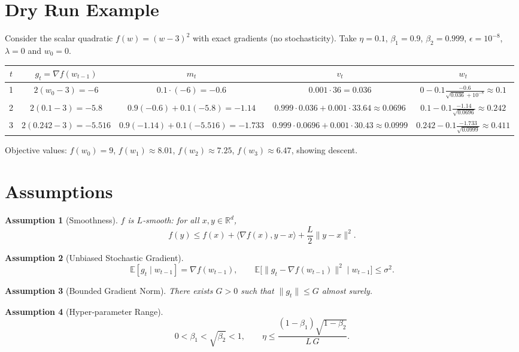 \documentclass[11pt]{article}
\newtheorem{assumption}{Assumption}
\newcommand{\E}{\mathbb{E}}
\newcommand{\R}{\mathbb{R}}
\begin{document}
\section*{Dry Run Example}
Consider the scalar quadratic $f(w)=(w-3)^2$ with exact gradients (no stochasticity).  
Take $\eta=0.1$, $\beta_1=0.9$, $\beta_2=0.999$, $\epsilon=10^{-8}$, $\lambda=0$ and $w_0=0$.  

\begin{tabular}{c|c|c|c|c}
$t$ & $g_t=\nabla f(w_{t-1})$ & $m_t$ & $v_t$ & $w_t$ \\ \hline
1 & $2(w_0-3)=-6$ & $0.1\cdot(-6)=-0.6$ & $0.001\cdot36=0.036$ & $0-0.1\frac{-0.6}{\sqrt{0.036}+10^{-8}}\approx0.1$\\
2 & $2(0.1-3)=-5.8$ & $0.9(-0.6)+0.1(-5.8)=-1.14$ & $0.999\cdot0.036+0.001\cdot33.64\approx0.0696$ & $0.1-0.1\frac{-1.14}{\sqrt{0.0696}}\approx0.242$\\
3 & $2(0.242-3)=-5.516$ & $0.9(-1.14)+0.1(-5.516)=-1.733$ & $0.999\cdot0.0696+0.001\cdot30.43\approx0.0999$ & $0.242-0.1\frac{-1.733}{\sqrt{0.0999}}\approx0.411$\\
\end{tabular}

Objective values: $f(w_0)=9$, $f(w_1)\approx8.01$, $f(w_2)\approx7.25$, $f(w_3)\approx6.47$, showing descent.

\newpage
\section*{Assumptions}
\begin{assumption}[Smoothness]
$f$ is $L$‑smooth: for all $x,y\in\R^{d}$,
\[
f(y)\le f(x)+\langle\nabla f(x),y-x\rangle+\frac{L}{2}\|y-x\|^{2}.
\]
\end{assumption}
\begin{assumption}[Unbiased Stochastic Gradient]
\[
\E[g_t\mid w_{t-1}]=\nabla f(w_{t-1}),\qquad 
\E\bigl[\|g_t-\nabla f(w_{t-1})\|^{2}\mid w_{t-1}\bigr]\le\sigma^{2}.
\]
\end{assumption}
\begin{assumption}[Bounded Gradient Norm]
There exists $G>0$ such that $\|g_t\|\le G$ almost surely.
\end{assumption}
\begin{assumption}[Hyper‑parameter Range]
\[
0<\beta_1<\sqrt{\beta_2}<1,\qquad
\eta\le \frac{(1-\beta_1)\sqrt{1-\beta_2}}{L\,G}.
\]
\end{assumption}
\end{document}
